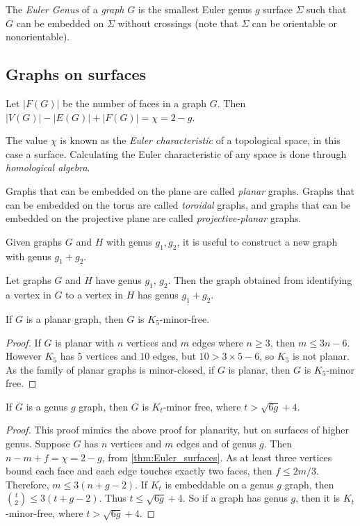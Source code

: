 The \textit{Euler Genus} of a \textit{graph} \(G\) is the smallest Euler genus \(g\) surface \(\Sigma\) such that \(G\) can be embedded on \(\Sigma\) without crossings (note that \(\Sigma\) can be orientable or nonorientable). 


\subsection{Graphs on surfaces}

\begin{theorem}\label{thm:Euler_surfaces}
	Let \(|F(G)|\) be the number of faces in a graph \(G\). Then \(|V(G)| - |E(G)| + |F(G)| = \chi = 2 - g\). 
\end{theorem}
The value $\chi$ is known as the \textit{Euler characteristic} of a topological space, in this case a surface. Calculating the Euler characteristic of any space is done through \textit{homological algebra}. 

Graphs that can be embedded on the plane are called \textit{planar} graphs. Graphs that can be embedded on the torus are called \textit{toroidal} graphs, and graphs that can be embedded on the projective plane are called \textit{projective-planar} graphs.

Given graphs $G$ and $H$ with genus $g_1, g_2$, it is useful to construct a new graph with genus $g_1 + g_2$. 
\begin{theorem}\label{thm:additivity_genus}
	Let graphs $G$ and $H$ have genus $g_1$, $g_2$. Then the graph obtained from identifying a vertex in $G$ to a vertex in $H$ has genus $g_1 + g_2$. 
\end{theorem}

\begin{theorem}\label{thm:K5_Free_Planar}
	If \(G\) is a planar graph, then \(G\) is \(K_5\)-minor-free.
\end{theorem}
\begin{proof}
	If \(G\) is planar with \(n\) vertices and \(m\) edges where $n \geq 3$, then \(m \leq 3n -6\).
	However \(K_5\) has \(5\) vertices and \(10\) edges, but  \( 10 > 3 \times 5 - 6\), so \(K_5\) is not planar. As the family of planar graphs is minor-closed, if \(G\) is planar, then $G$ is \(K_5\)-minor free.
\end{proof}

\begin{theorem}\label{thm:bounded_genus_kt_free}
	If \(G\) is a genus \(g\) graph, then \(G\) is \(K_t\)-minor free, where \(t > \sqrt{6g} + 4\). 
\end{theorem}
\begin{proof}
	This proof mimics the above proof for planarity, but on surfaces of higher genus. 
	Suppose \(G\) has \(n\) vertices and \(m\) edges and of genus $g$. Then \(n - m + f = \chi = 2-g\), from \cref{thm:Euler_surfaces}. As at least three vertices bound each face and each edge touches exactly two faces, then \(f \leq 2m/3\). Therefore, \(m \leq 3(n + g - 2)\). If \(K_t\) is embeddable on a genus \(g\) graph, then \(\binom{t}{2} \leq 3 (t + g - 2)\). Thus \(t \leq \sqrt{6g} + 4\). So if a graph has genus \(g\), then it is \(K_t\)-minor-free, where \(t > \sqrt{6g} + 4\). 
\end{proof}